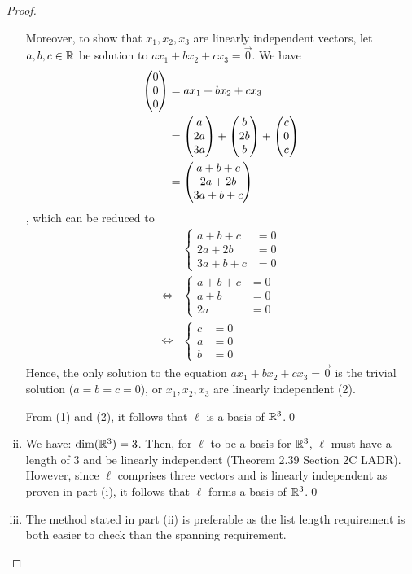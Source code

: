 \begin{proof}
\begin{enumerate}[(i)]
        Moreover, to show that $x_1,x_2,x_3$ are linearly independent vectors, let $a,b,c\in\mathbb R$ be solution to $ax_1+bx_2+cx_3=\vec{0}$. We have 
        \[
            \begin{aligned}
                \begin{pmatrix} 0\\ 0\\ 0\end{pmatrix}
                &= ax_1+bx_2+cx_3\\
                &= \begin{pmatrix} a\\ 2a\\ 3a\end{pmatrix}+\begin{pmatrix} b\\ 2b\\ b\end{pmatrix}+\begin{pmatrix} c\\ 0\\ c\end{pmatrix}\\
                &= \begin{pmatrix} a+b+c\\ 2a+2b\\ 3a+b+c\end{pmatrix}
            \end{aligned}
        \]
        , which can be reduced to
        \begin{align*}
            &\begin{cases}
                a+b+c  &= 0\\
                2a+2b  &= 0\\
                3a+b+c &= 0
            \end{cases}\\\iff
            &\begin{cases}
                a+b+c  &= 0\\
                a+b    &= 0\\
                2a     &= 0
            \end{cases}\\\iff
            &\begin{cases}
                c      &= 0\\
                a      &= 0\\
                b      &= 0
            \end{cases}
        \end{align*}
        Hence, the only solution to the equation $ax_1+bx_2+cx_3=\vec{0}$ is the trivial solution ($a=b=c=0$), or $x_1,x_2,x_3$ are linearly independent (2). 

        From (1) and (2), it follows that $\ell$ is a basis of $\mathbb R^3$.\qed
        \item We have: $\textnormal{dim}(\mathbb R^3)=3$. Then, for $\ell$ to be a basis for $\mathbb R^3$, $\ell$ must have a length of 3 and be linearly independent (Theorem 2.39 Section 2C LADR). However, since $\ell$ comprises three vectors and is linearly independent as proven in part (i), it follows that $\ell$ forms a basis of $\mathbb R^3$.\qed
        \item The method stated in part (ii) is preferable as the list length requirement is both easier to check than the spanning requirement.
    \end{enumerate}
    \renewcommand{\qedsymbol}{}
\end{proof}